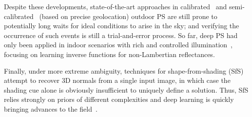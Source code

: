 




Despite these developments, state-of-the-art approaches in calibrated~\cite{yu-iccp-13} and semi-calibrated~\cite{jung-cvpr-15} (based on precise geolocation) outdoor PS are still prone to potentially long waits for ideal conditions to arise in the sky; and verifying the occurrence of such events is still a trial-and-error process. So far, deep PS had only been applied in indoor scenarios with rich and controlled illumination~\cite{yu-iccv-17,santo-iccv-17,taniai-arxiv-18,shi-tpami-18}, focusing on learning inverse functions for non-Lambertian reflectances.



Finally, under more extreme ambiguity, techniques for shape-from-shading (SfS)~\cite{Horn1989,Zhang1999,Langer1994,oxholm-eccv-12,johnson-cvpr-11,barron-pami-15} attempt to recover 3D normals from a single input image, in which case the shading cue alone is obviously insufficient to uniquely define a solution. Thus, SfS relies strongly on priors of different complexities and deep learning is quickly bringing advances to the field~\cite{eigen-iccv-15,shu-cvpr-17,wu-nips-17,shu-cvpr-17}.


